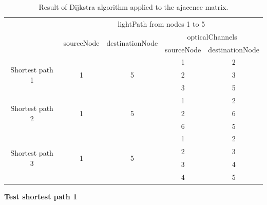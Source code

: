 \begin{table}[H]
	\centering
	\begin{tabular}{c|c|c|c|c|}
		\cline{2-5}
		& \multicolumn{4}{c|}{lightPath from nodes 1 to 5} \\ \cline{2-5} 
		& \multirow{2}{*}{sourceNode} & \multirow{2}{*}{destinationNode} & \multicolumn{2}{c|}{opticalChannels} \\ \cline{4-5} 
		&  &  & sourceNode & destinationNode \\ \cline{2-5} 
		\multirow{3}{*}{Shortest path 1} & \multirow{3}{*}{1} & \multirow{3}{*}{5} & 1 & 2 \\ \cline{4-5} 
		&  &  & 2 & 3 \\ \cline{4-5} 
		&  &  & 3 & 5 \\ \cline{2-5} 
		\multirow{3}{*}{Shortest path 2} & \multirow{3}{*}{1} & \multirow{3}{*}{5} & 1 & 2 \\ \cline{4-5} 
		&  &  & 2 & 6 \\ \cline{4-5} 
		&  &  & 6 & 5 \\ \cline{2-5} 
		\multirow{4}{*}{Shortest path 3} & \multirow{4}{*}{1} & \multirow{4}{*}{5} & 1 & 2 \\ \cline{4-5} 
		&  &  & 2 & 3 \\ \cline{4-5} 
		&  &  & 3 & 4 \\ \cline{4-5} 
		&  &  & 4 & 5 \\ \cline{2-5} 
	\end{tabular}
	\caption{Result of Dijkstra algorithm applied to the ajacence matrix.}
\end{table}

\textbf{Test shortest path 1}\\ 

